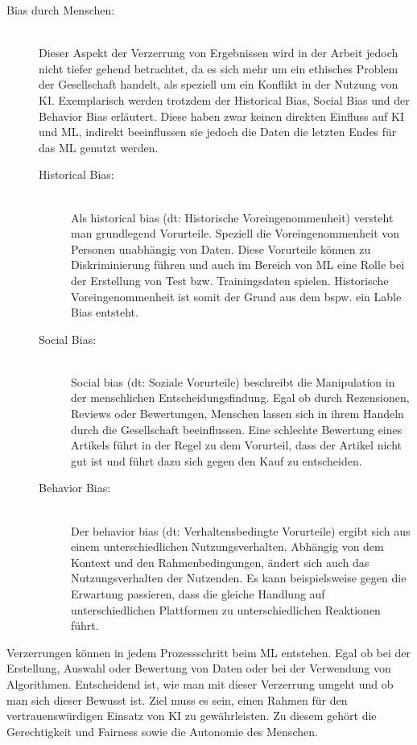 \begin{onehalfspace}
\begin{description}
            \item [Bias durch Menschen:] \hfill \\
            Dieser Aspekt der Verzerrung von Ergebnissen wird in der Arbeit jedoch nicht tiefer gehend betrachtet, da es sich mehr um ein ethisches Problem der Gesellschaft handelt, als speziell um ein Konflikt in der Nutzung von \ac{KI}. Exemplarisch werden trotzdem der Historical Bias, Social Bias und der Behavior Bias erläutert. Diese haben zwar keinen direkten Einfluss auf \ac*{KI} und \ac*{ML}, indirekt beeinflussen sie jedoch die Daten die letzten Endes für das \ac*{ML} genutzt werden.
            \begin{description}
                \item [Historical Bias:] \hfill \\
                Als \glqq{}historical bias\grqq{} (\ac*{dt}: Historische Voreingenommenheit) versteht man grundlegend Vorurteile. Speziell die Voreingenommenheit von Personen unabhängig von Daten. Diese Vorurteile können zu Diskriminierung führen und auch im Bereich von \ac*{ML} eine Rolle bei der Erstellung von Test bzw. Trainingsdaten spielen. Historische Voreingenommenheit ist somit der Grund aus dem bspw. ein Lable Bias entsteht.\cite{Mehrabi2021}\cite{Parkavi2018}
                \item [Social Bias:] \hfill \\
                \glqq{}Social bias\grqq{} (\ac*{dt}: Soziale Vorurteile) beschreibt die Manipulation in der menschlichen Entscheidungsfindung. Egal ob durch Rezensionen, Reviews oder Bewertungen, Menschen lassen sich in ihrem Handeln durch die Gesellschaft beeinflussen. Eine schlechte Bewertung eines Artikels führt in der Regel zu dem Vorurteil, dass der Artikel nicht gut ist und führt dazu sich gegen den Kauf zu entscheiden.\cite{Mehrabi2021}\cite{Parkavi2018}
                \item [Behavior Bias:] \hfill \\
                Der \glqq{}behavior bias\grqq{} (\ac*{dt}: Verhaltensbedingte Vorurteile) ergibt sich aus einem unterschiedlichen Nutzungsverhalten. Abhängig von dem Kontext und den Rahmenbedingungen, ändert sich auch das Nutzungsverhalten der Nutzenden. Es kann beispielsweise gegen die Erwartung passieren, dass die gleiche Handlung auf unterschiedlichen Plattformen zu unterschiedlichen Reaktionen führt.\cite{Mehrabi2021}
            \end{description}
        \end{description}
        Verzerrungen können in jedem Prozessschritt beim \ac*{ML} entstehen. Egal ob bei der Erstellung, Auswahl oder Bewertung von Daten oder bei der Verwendung von Algorithmen. Entscheidend ist, wie man mit dieser Verzerrung umgeht und ob man sich dieser Bewusst ist. Ziel muss es sein, einen Rahmen für den vertrauenswürdigen Einsatz von \ac*{KI} zu gewährleisten. Zu diesem gehört die Gerechtigkeit und Fairness sowie die Autonomie des Menschen. 

\end{onehalfspace}
